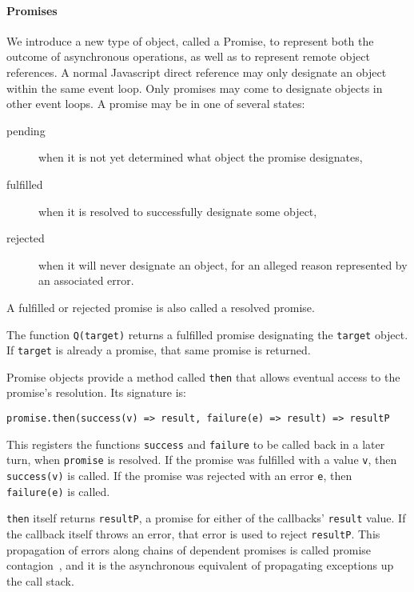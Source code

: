 \documentclass{llncs}
\begin{document}
\paragraph{Promises}

We introduce a new type of object, called a Promise, to represent both the outcome of asynchronous operations, as well as to represent remote object references. A normal Javascript direct reference may only designate an object within the same event loop. Only promises may come to designate objects in other event loops. A promise may be in one of several states:

\begin{description}
  \item[pending] when it is not yet determined what object the promise designates,
  \item[fulfilled] when it is resolved to successfully designate some object,
  \item[rejected] when it will never designate an object, for an alleged reason represented by an associated error.
\end{description}

A fulfilled or rejected promise is also called a resolved promise.

The function \texttt{Q(target)} returns a fulfilled promise designating the \texttt{target} object. If \texttt{target} is already a promise, that same promise is returned.

Promise objects provide a method called \texttt{then} that allows eventual access to the promise's resolution. Its signature is:

\begin{verbatim}
promise.then(success(v) => result, failure(e) => result) => resultP
\end{verbatim}

This registers the functions \texttt{success} and \texttt{failure} to be called back in a later turn, when \texttt{promise} is resolved. If the promise was fulfilled with a value \texttt{v}, then \texttt{success(v)} is called. If the promise was rejected with an error \texttt{e}, then \texttt{failure(e)} is called.

\texttt{then} itself returns \texttt{resultP}, a promise for either of the callbacks' \texttt{result} value. If the callback itself throws an error, that error is used to reject \texttt{resultP}. This propagation of errors along chains of dependent promises is called promise contagion~\cite{miller:strangers}, and it is the asynchronous equivalent of propagating exceptions up the call stack.
\end{document}
